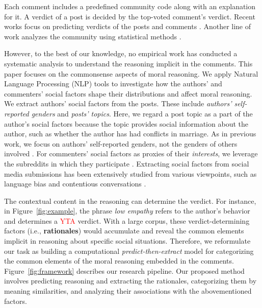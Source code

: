 \documentclass[letterpaper]{article} %
\begin{document}
Each comment includes a predefined community code along with an explanation for it.
A verdict of a post is decided by the top-voted comment's verdict.
Recent works focus on predicting verdicts of the posts and comments \cite{lourie-2020-scruples, zhou-2021-assessing, botzer-2022-analysis, xi-2023-blame}.
Another line of work analyzes the community using statistical methods \cite{botzer-2022-analysis, nguyen-2022-mapping, candia-2022-demo}.

However, to the best of our knowledge, no empirical work has conducted a systematic analysis to understand the reasoning implicit in the comments.
This paper focuses on the commonsense aspects of moral reasoning.
We apply Natural Language Processing (NLP) tools to investigate how the authors' and commenters' social factors shape their distributions and affect moral reasoning.
We extract authors' social factors from the posts.
These include \emph{authors' self-reported genders} and \emph{posts' topics}.
Here, we regard a post topic as a part of the author's social factors because the topic provides social information about the author, such as whether the author has had conflicts in marriage. 
As in previous work, we focus on authors' self-reported genders, not the genders of others involved \cite{botzer-2022-analysis, candia-2022-demo}.
For commenters' social factors as proxies of their \emph{interests}, we leverage the subreddits in which they participate \cite{candia-2022-demo}.
Extracting social factors from social media submissions has been extensively studied from various viewpoints, such as language bias \cite{ferrer-2021-biasreddit} and contentious conversations \cite{beel-2022-linguistic}. 

The contextual content in the reasoning can determine the verdict.
For instance, in Figure~\ref{fig:example}, the phrase \emph{low empathy} refers to the author's behavior and determines a \textcolor{red}{YTA} verdict. 
With a large corpus, these verdict-determining factors (i.e., \textbf{rationales}) would accumulate and reveal the common elements implicit in reasoning about specific social situations.
Therefore, we reformulate our task as building a computational \emph{predict-then-extract} model for categorizing the common elements of the moral reasoning embedded in the comments.
Figure~\ref{fig:framework} describes our research pipeline. 
Our proposed method involves predicting reasoning and extracting the rationales, categorizing them by meaning similarities, and analyzing their associations with the abovementioned factors.
\end{document}
